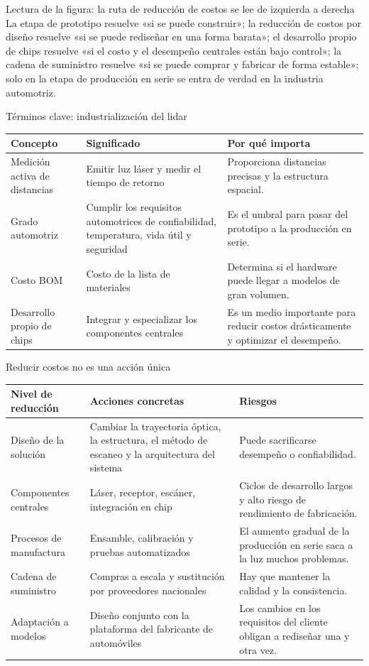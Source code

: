 \documentclass[a4paper]{article}
\begin{document}
\begin{knowledgebox}{Lectura de la figura: la ruta de reducción de costos se lee de izquierda a derecha}
La etapa de prototipo resuelve «si se puede construir»; la reducción de costos por diseño resuelve «si se puede rediseñar en una forma barata»; el desarrollo propio de chips resuelve «si el costo y el desempeño centrales están bajo control»; la cadena de suministro resuelve «si se puede comprar y fabricar de forma estable»; solo en la etapa de producción en serie se entra de verdad en la industria automotriz.
\end{knowledgebox}

\begin{knowledgebox}{Términos clave: industrialización del lidar}
\begin{tabularx}{\textwidth}{p{}p{}X}
\toprule
Concepto & Significado & Por qué importa \\
\midrule
Medición activa de distancias & Emitir luz láser y medir el tiempo de retorno & Proporciona distancias precisas y la estructura espacial. \\
Grado automotriz & Cumplir los requisitos automotrices de confiabilidad, temperatura, vida útil y seguridad & Es el umbral para pasar del prototipo a la producción en serie. \\
Costo BOM & Costo de la lista de materiales & Determina si el hardware puede llegar a modelos de gran volumen. \\
Desarrollo propio de chips & Integrar y especializar los componentes centrales & Es un medio importante para reducir costos drásticamente y optimizar el desempeño. \\
\bottomrule
\end{tabularx}
\end{knowledgebox}

\begin{knowledgebox}{Reducir costos no es una acción única}
\begin{tabularx}{\textwidth}{p{}p{}X}
\toprule
Nivel de reducción & Acciones concretas & Riesgos \\
\midrule
Diseño de la solución & Cambiar la trayectoria óptica, la estructura, el método de escaneo y la arquitectura del sistema & Puede sacrificarse desempeño o confiabilidad. \\
Componentes centrales & Láser, receptor, escáner, integración en chip & Ciclos de desarrollo largos y alto riesgo de rendimiento de fabricación. \\
Procesos de manufactura & Ensamble, calibración y pruebas automatizados & El aumento gradual de la producción en serie saca a la luz muchos problemas. \\
Cadena de suministro & Compras a escala y sustitución por proveedores nacionales & Hay que mantener la calidad y la consistencia. \\
Adaptación a modelos & Diseño conjunto con la plataforma del fabricante de automóviles & Los cambios en los requisitos del cliente obligan a rediseñar una y otra vez. \\
\bottomrule
\end{tabularx}
\end{knowledgebox}
\end{document}
